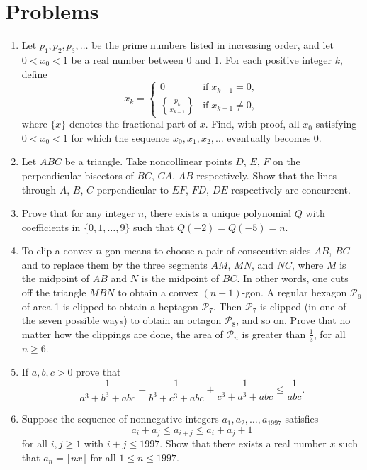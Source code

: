 \documentclass[11pt]{scrartcl}
\begin{document}
\section{Problems}
\begin{enumerate}[\bfseries 1.]
\item %
Let $p_1, p_2, p_3, \dots$ be the prime numbers
listed in increasing order,
and let $0 < x_0 < 1$ be a real number between 0 and 1.
For each positive integer $k$, define
\[ x_k = \begin{cases} 0 & \mbox{if} \; x_{k-1} = 0, \\[.1in]
  {\displaystyle \left\{ \frac{p_k}{x_{k-1}} \right\}}
  & \mbox{if} \; x_{k-1} \neq 0,
  \end{cases}  \]
where $\{x\}$ denotes the fractional part of $x$.
Find, with proof, all $x_0$ satisfying $0 < x_0 < 1$
for which the sequence $x_0, x_1, x_2, \dots$ eventually becomes $0$.

\item %
Let $ABC$ be a triangle.
Take noncollinear points $D$, $E$, $F$ on the perpendicular bisectors
of $BC$, $CA$, $AB$ respectively.
Show that the lines through $A$, $B$, $C$
perpendicular to $EF$, $FD$, $DE$ respectively are concurrent.

\item %
Prove that for any integer $n$,
there exists a unique polynomial $Q$ with coefficients
in $\{0,1,\dots,9\}$ such that $Q(-2) = Q(-5) = n$.

\item %
To clip a convex $n$-gon means to choose a pair of
consecutive sides $AB$, $BC$ and to replace them
by the three segments $AM$, $MN$, and $NC$,
where $M$ is the midpoint of $AB$ and $N$ is the midpoint of $BC$.
In other words, one cuts off the triangle $MBN$ to obtain a convex $(n+1)$-gon.
A regular hexagon $\mathcal{P}_6$ of area 1 is clipped to obtain a
heptagon $\mathcal{P}_7$.
Then $\mathcal{P}_7$ is clipped (in one of the seven possible ways)
to obtain an octagon $\mathcal{P}_8$, and so on.
Prove that no matter how the clippings are done,
the area of $\mathcal{P}_n$ is greater than $\frac 13$, for all $n \geq 6$.

\item %
If $a,b,c > 0$ prove that
\[
  \frac{1}{a^3+b^3+abc}
  + \frac{1}{b^3+c^3+abc}
  + \frac{1}{c^3+a^3+abc}
  \le \frac{1}{abc}.
\]

\item %
Suppose the sequence of nonnegative integers
$a_1, a_2, \dots, a_{1997}$ satisfies
\[ a_i + a_j \leq a_{i+j} \leq a_i + a_j + 1  \]
for all $i,j \geq 1$ with $i + j \leq 1997$.
Show that there exists a real number $x$ such that
$a_n = \lfloor nx \rfloor$ for all $1 \leq n \leq 1997$.

\end{enumerate}
\pagebreak
\end{document}
